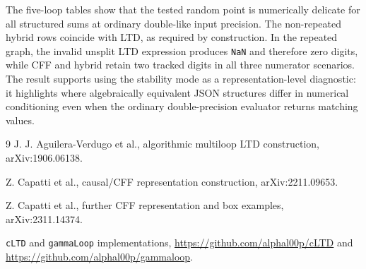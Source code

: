 \documentclass[11pt,a4paper]{report}
\begin{document}
The five-loop tables show that the tested random point is numerically delicate
for all structured sums at ordinary double-like input precision.  The
non-repeated hybrid rows coincide with LTD, as required by construction.  In
the repeated graph, the invalid unsplit LTD expression produces \texttt{NaN}
and therefore zero digits, while CFF and hybrid retain two tracked digits in
all three numerator scenarios.  The result supports using the stability mode as
a representation-level diagnostic: it highlights where algebraically equivalent
JSON structures differ in numerical conditioning even when the ordinary
double-precision evaluator returns matching values.

\begin{thebibliography}{9}
  J. J. Aguilera-Verdugo et al.,
  algorithmic multiloop LTD construction, arXiv:1906.06138.

  Z. Capatti et al.,
  causal/CFF representation construction, arXiv:2211.09653.

  Z. Capatti et al.,
  further CFF representation and box examples, arXiv:2311.14374.

  \texttt{cLTD} and \texttt{gammaLoop} implementations,
  \url{https://github.com/alphal00p/cLTD} and
  \url{https://github.com/alphal00p/gammaloop}.
\end{thebibliography}
\end{document}

